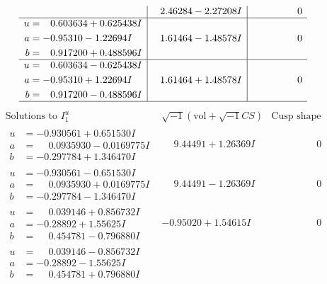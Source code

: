 \documentclass[1p]{elsarticle_modified}
\theoremstyle{definition}
\newcommand{\I}{\sqrt{-1}}
\begin{document}
$$\begin{array}{c|c|c}
 & \phantom{-}2.46284 - 2.27208 I & \phantom{-0.000000 } 0 \\ \hline\begin{aligned}
u &= \phantom{-}0.603634 + 0.625438 I \\
a &= -0.95310 - 1.22694 I \\
b &= \phantom{-}0.917200 + 0.488596 I\end{aligned}
 & \phantom{-}1.61464 - 1.48578 I & \phantom{-0.000000 } 0 \\ \hline\begin{aligned}
u &= \phantom{-}0.603634 - 0.625438 I \\
a &= -0.95310 + 1.22694 I \\
b &= \phantom{-}0.917200 - 0.488596 I\end{aligned}
 & \phantom{-}1.61464 + 1.48578 I & \phantom{-0.000000 } 0\\
 \hline 
 \end{array}$$\newpage$$\begin{array}{c|c|c}  
\text{Solutions to }I^u_{1}& \I (\text{vol} + \sqrt{-1}CS) & \text{Cusp shape}\\
 \hline 
\begin{aligned}
u &= -0.930561 + 0.651530 I \\
a &= \phantom{-}0.0935930 - 0.0169775 I \\
b &= -0.297784 + 1.346470 I\end{aligned}
 & \phantom{-}9.44491 + 1.26369 I & \phantom{-0.000000 } 0 \\ \hline\begin{aligned}
u &= -0.930561 - 0.651530 I \\
a &= \phantom{-}0.0935930 + 0.0169775 I \\
b &= -0.297784 - 1.346470 I\end{aligned}
 & \phantom{-}9.44491 - 1.26369 I & \phantom{-0.000000 } 0 \\ \hline\begin{aligned}
u &= \phantom{-}0.039146 + 0.856732 I \\
a &= -0.28892 + 1.55625 I \\
b &= \phantom{-}0.454781 - 0.796880 I\end{aligned}
 & -0.95020 + 1.54615 I & \phantom{-0.000000 } 0 \\ \hline\begin{aligned}
u &= \phantom{-}0.039146 - 0.856732 I \\
a &= -0.28892 - 1.55625 I \\
b &= \phantom{-}0.454781 + 0.796880 I\end{aligned}

\end{array}$$
\end{document}
